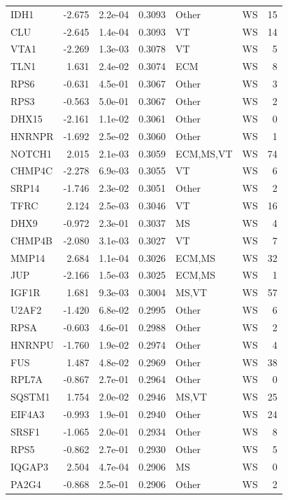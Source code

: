 \begin{table}[ht]
\begin{tabular}{lrlrllr}
  IDH1 & -2.675 & 2.2e-04 & 0.3093 & Other & WS & 15 \\ 
  CLU & -2.645 & 1.4e-04 & 0.3093 & VT & WS & 14 \\ 
  VTA1 & -2.269 & 1.3e-03 & 0.3078 & VT & WS & 5 \\ 
  TLN1 & 1.631 & 2.4e-02 & 0.3074 & ECM & WS & 8 \\ 
  RPS6 & -0.631 & 4.5e-01 & 0.3067 & Other & WS & 3 \\ 
  RPS3 & -0.563 & 5.0e-01 & 0.3067 & Other & WS & 2 \\ 
  DHX15 & -2.161 & 1.1e-02 & 0.3061 & Other & WS & 0 \\ 
  HNRNPR & -1.692 & 2.5e-02 & 0.3060 & Other & WS & 1 \\ 
  NOTCH1 & 2.015 & 2.1e-03 & 0.3059 & ECM,MS,VT & WS & 74 \\ 
  CHMP4C & -2.278 & 6.9e-03 & 0.3055 & VT & WS & 6 \\ 
  SRP14 & -1.746 & 2.3e-02 & 0.3051 & Other & WS & 2 \\ 
  TFRC & 2.124 & 2.5e-03 & 0.3046 & VT & WS & 16 \\ 
  DHX9 & -0.972 & 2.3e-01 & 0.3037 & MS & WS & 4 \\ 
  CHMP4B & -2.080 & 3.1e-03 & 0.3027 & VT & WS & 7 \\ 
  MMP14 & 2.684 & 1.1e-04 & 0.3026 & ECM,MS & WS & 32 \\ 
  JUP & -2.166 & 1.5e-03 & 0.3025 & ECM,MS & WS & 1 \\ 
  IGF1R & 1.681 & 9.3e-03 & 0.3004 & MS,VT & WS & 57 \\ 
  U2AF2 & -1.420 & 6.8e-02 & 0.2995 & Other & WS & 6 \\ 
  RPSA & -0.603 & 4.6e-01 & 0.2988 & Other & WS & 2 \\ 
  HNRNPU & -1.760 & 1.9e-02 & 0.2974 & Other & WS & 4 \\ 
  FUS & 1.487 & 4.8e-02 & 0.2969 & Other & WS & 38 \\ 
  RPL7A & -0.867 & 2.7e-01 & 0.2964 & Other & WS & 0 \\ 
  SQSTM1 & 1.754 & 2.0e-02 & 0.2946 & MS,VT & WS & 25 \\ 
  EIF4A3 & -0.993 & 1.9e-01 & 0.2940 & Other & WS & 24 \\ 
  SRSF1 & -1.065 & 2.0e-01 & 0.2934 & Other & WS & 8 \\ 
  RPS5 & -0.862 & 2.7e-01 & 0.2930 & Other & WS & 5 \\ 
  IQGAP3 & 2.504 & 4.7e-04 & 0.2906 & MS & WS & 0 \\ 
  PA2G4 & -0.868 & 2.5e-01 & 0.2906 & Other & WS & 2 \\ 

\end{tabular}
\end{table}

